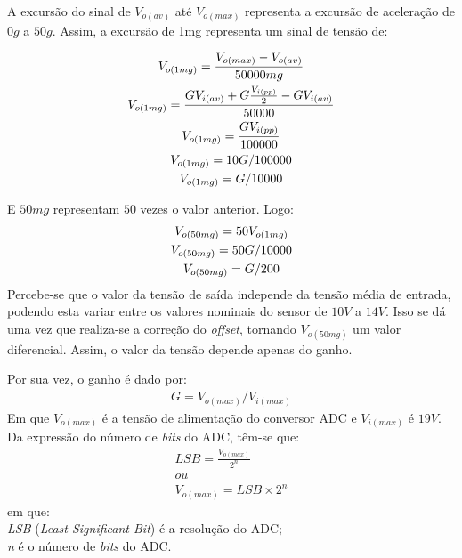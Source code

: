 \documentclass[11pt]{abntex2}
\begin{document}
			A excursão do sinal de $V_{o(av)}$ até $V_{o(max)}$ representa a excursão de aceleração
			de $0g$ a $50g$. Assim, a excursão de 1mg representa um sinal de tensão de:

			\begin{gather*}
				V_{o(1mg)} = \frac{V_{o(max)} - V_{o(av)}}{50000mg}\\
				V_{o(1mg)} = \frac{G\*V_{i(av)} + G\*\frac{V_{i(pp)}}{2} - G\*V_{i(av)}}{50000}\\
				V_{o(1mg)} = \frac{G\*V_{i(pp)}}{100000}\\
				V_{o(1mg)} = 10\*G/100000\\
				V_{o(1mg)} = G/10000
			\end{gather*}
			
			E $50mg$ representam $50$ vezes o valor anterior. Logo:
			\begin{gather*}
				V_{o(50mg)} =50\*V_{o(1mg)}\\
				V_{o(50mg)} =50\*G/10000\\
				V_{o(50mg)} =G/200
			\end{gather*}
			Percebe-se que o valor da tensão de saída independe da tensão média
			de entrada, podendo esta variar entre os valores nominais do sensor
			de $10V$ a $14V$. Isso se dá uma vez que realiza-se a correção do
			\textit{offset}, tornando $V_{o(50mg)}$ um valor diferencial. Assim,
			o valor da tensão depende apenas do ganho.
			
			Por sua vez, o ganho é dado por:
			\begin{gather*}
				G = V_{o(max)}/V_{i(max)}
			\end{gather*}
			Em que $V_{o(max)}$ é a tensão de alimentação do conversor ADC e $V_{i(max)}$ é
			$19V$. Da expressão do número de \textit{bits} do ADC, têm-se que:
			\begin{gather*}
				LSB = \frac{V_{o(max)}}{2^n}\\
				ou\\
				V_{o(max)} = LSB\times 2^n
			\end{gather*}
			em que:\\
			\textit{LSB} (\textit{Least Significant Bit}) é a resolução do ADC;\\
			\textit{n} é o número de \textit{bits} do ADC.\\
			
\end{document}
